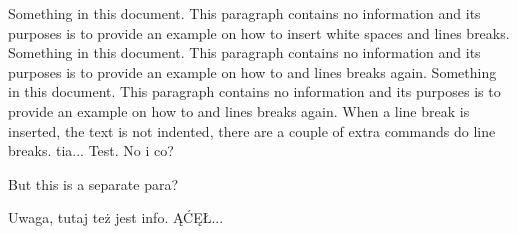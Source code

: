\documentclass{article}
\begin{document}
Something in this document. This paragraph contains no information 
and its purposes is to provide an example on how to insert white 
spaces and lines breaks.\\
Something in this document. This paragraph contains no information 
and its purposes is to provide an example on how to and lines breaks again.\hfill\break %
Something in this document. This paragraph contains no information 
and its purposes is to provide an example on how to and lines breaks again.\newline
When a line break is inserted, the text is not indented, there are 
a couple of extra commands do line breaks. \hfill tia...
Test. \break
No i co? 

But this is a separate para?

\vspace{4cm}

Uwaga, tutaj też jest info. ĄĆĘŁ...

\captionsetup[subfigure]{position=b}
\end{document}
